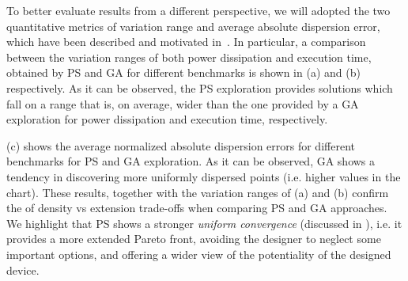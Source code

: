 To better evaluate results from a different perspective, we will
adopted the two quantitative metrics of variation range and average absolute
dispersion error, which have been described and motivated
in~. In particular, a comparison between the variation
ranges of both power dissipation and execution time, obtained by PS
and GA for different benchmarks is shown in (a) and
(b) respectively.  As it can be observed, the PS exploration provides
solutions which fall on a range that is, on average, wider than the
one provided by a GA exploration for power dissipation and execution
time, respectively.

\begin{figure}
  \begin{center}
  \end{center}
\end{figure}

(c) shows the average normalized absolute dispersion
errors for different benchmarks for PS and GA exploration.  As it can
be observed, GA shows a tendency in discovering more uniformly
dispersed points (i.e. higher values in the chart). These results,
together with the variation ranges of (a) and (b)
confirm the of density vs extension trade-offs when comparing PS and
GA approaches. We highlight that PS shows a stronger \emph{uniform convergence} (discussed in ), i.e. it provides a more extended Pareto front, avoiding the designer to neglect some important options, and offering a wider view of the potentiality of the designed device.

